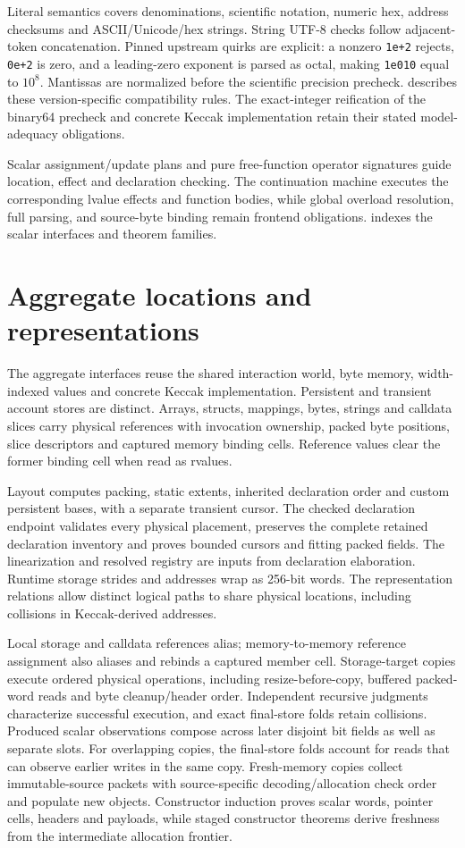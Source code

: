 \documentclass[conference]{IEEEtran}
\newcommand{\code}[1]{\texttt{#1}}
\begin{document}
Literal semantics covers denominations, scientific notation, numeric hex,
address checksums and ASCII/Unicode/hex strings. String UTF-8 checks follow
adjacent-token concatenation. Pinned upstream quirks are explicit: a nonzero
\code{1e+2} rejects, \code{0e+2} is zero, and a leading-zero exponent is parsed
as octal, making \code{1e010} equal to $10^8$. Mantissas are normalized before
the scientific precision precheck.  describes these
version-specific compatibility rules. The exact-integer
reification of the binary64 precheck and concrete Keccak implementation retain
their stated model-adequacy obligations.

Scalar assignment/update plans and pure free-function operator signatures
guide location, effect and declaration checking. The continuation machine
executes the corresponding lvalue effects and function bodies, while global
overload resolution, full parsing, and source-byte binding remain frontend
obligations.  indexes the scalar interfaces and theorem families.

\section{Aggregate locations and representations}
The aggregate interfaces reuse the shared interaction world, byte memory,
width-indexed values and concrete Keccak implementation. Persistent and
transient account stores are distinct. Arrays, structs, mappings, bytes,
strings and calldata slices carry physical references with invocation ownership,
packed byte positions, slice descriptors and captured memory binding cells.
Reference values clear the former binding cell when read as rvalues.

Layout computes packing, static extents, inherited declaration order and custom
persistent bases, with a separate transient cursor. The checked declaration
endpoint validates every physical placement, preserves the complete retained
declaration inventory and proves bounded cursors and fitting packed fields.
The linearization and resolved registry are inputs from declaration elaboration.
Runtime storage strides and addresses wrap as 256-bit words. The representation
relations allow distinct logical paths to share physical locations, including
collisions in Keccak-derived addresses.

Local storage and calldata references alias; memory-to-memory reference
assignment also aliases and rebinds a captured member cell. Storage-target
copies execute ordered physical operations, including resize-before-copy,
buffered packed-word reads and byte cleanup/header order. Independent recursive
judgments characterize successful execution, and exact final-store folds retain
collisions. Produced scalar observations compose across later disjoint bit
fields as well as separate slots. For overlapping copies, the final-store folds
account for reads that can observe earlier writes in the same copy. Fresh-memory
copies collect immutable-source packets with source-specific decoding/allocation
check order and populate new
objects. Constructor induction proves scalar words, pointer cells, headers and
payloads, while staged constructor theorems derive freshness from the
intermediate allocation frontier.
\end{document}
